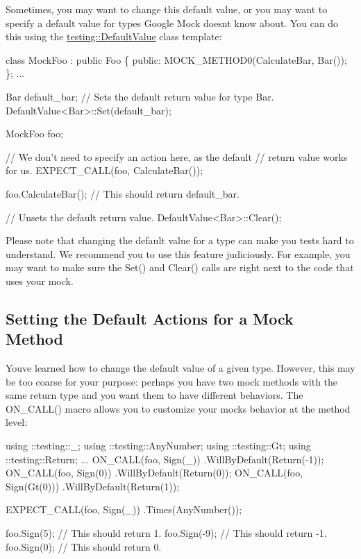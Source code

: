 Sometimes, you may want to change this default value, or you may want to specify a default value for types Google Mock doesn\textquotesingle{}t know about. You can do this using the {\ttfamily \hyperlink{classtesting_1_1DefaultValue}{testing\+::\+Default\+Value}} class template\+:


\begin{DoxyCode}
\textcolor{keyword}{class }MockFoo : \textcolor{keyword}{public} Foo \{
 \textcolor{keyword}{public}:
  MOCK\_METHOD0(CalculateBar, Bar());
\};
...

  Bar default\_bar;
  \textcolor{comment}{// Sets the default return value for type Bar.}
  DefaultValue<Bar>::Set(default\_bar);

  MockFoo foo;

  \textcolor{comment}{// We don't need to specify an action here, as the default}
  \textcolor{comment}{// return value works for us.}
  EXPECT\_CALL(foo, CalculateBar());

  foo.CalculateBar();  \textcolor{comment}{// This should return default\_bar.}

  \textcolor{comment}{// Unsets the default return value.}
  DefaultValue<Bar>::Clear();
\end{DoxyCode}


Please note that changing the default value for a type can make you tests hard to understand. We recommend you to use this feature judiciously. For example, you may want to make sure the {\ttfamily Set()} and {\ttfamily Clear()} calls are right next to the code that uses your mock.

\subsection*{Setting the Default Actions for a Mock Method}

You\textquotesingle{}ve learned how to change the default value of a given type. However, this may be too coarse for your purpose\+: perhaps you have two mock methods with the same return type and you want them to have different behaviors. The {\ttfamily O\+N\+\_\+\+C\+A\+L\+L()} macro allows you to customize your mock\textquotesingle{}s behavior at the method level\+:


\begin{DoxyCode}
using ::testing::\_;
using ::testing::AnyNumber;
using ::testing::Gt;
using ::testing::Return;
...
  ON\_CALL(foo, Sign(\_))
      .WillByDefault(Return(-1));
  ON\_CALL(foo, Sign(0))
      .WillByDefault(Return(0));
  ON\_CALL(foo, Sign(Gt(0)))
      .WillByDefault(Return(1));

  EXPECT\_CALL(foo, Sign(\_))
      .Times(AnyNumber());

  foo.Sign(5);   \textcolor{comment}{// This should return 1.}
  foo.Sign(-9);  \textcolor{comment}{// This should return -1.}
  foo.Sign(0);   \textcolor{comment}{// This should return 0.}
\end{DoxyCode}


